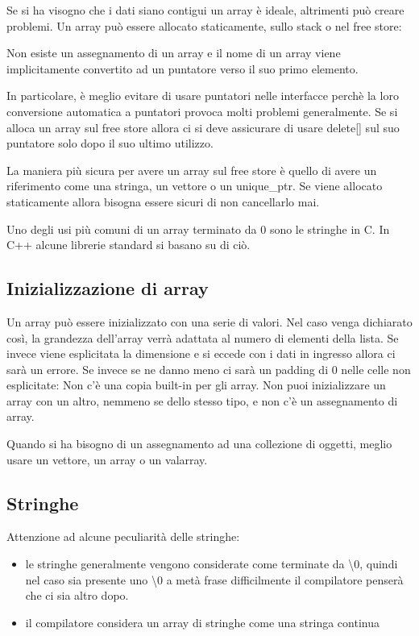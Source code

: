 \documentclass[11pt,a4paper]{book}
\begin{document}
Se si ha visogno che i dati siano contigui un array è ideale, altrimenti può creare problemi.
\label{code: 082}
Un array può essere allocato staticamente, sullo stack o nel free store:
\label{code: 083}

Non esiste un assegnamento di un array e il nome di un array viene implicitamente convertito ad un puntatore verso il suo primo elemento.

In particolare, è meglio evitare di usare puntatori nelle interfacce perchè la loro conversione automatica a puntatori provoca molti problemi generalmente. Se si alloca un array sul free store allora ci si deve assicurare di usare delete[] sul suo puntatore solo dopo il suo ultimo utilizzo.

La maniera più sicura per avere un array sul free store è quello di avere un riferimento come una stringa, un vettore o un unique\_ptr. Se viene allocato staticamente allora bisogna essere sicuri di non cancellarlo mai.

Uno degli usi più comuni di un array terminato da 0 sono le stringhe in C. In C++ alcune librerie standard si basano su di ciò.

\subsection{Inizializzazione di array}
Un array può essere inizializzato con una serie di valori. Nel caso venga dichiarato così, la grandezza dell'array verrà adattata al numero di elementi della lista. Se invece viene esplicitata la dimensione e si eccede con i dati in ingresso allora ci sarà un errore. Se invece se ne danno meno ci sarà un padding di 0 nelle celle non esplicitate:
\label{code: 084}
Non c'è una copia built-in per gli array. Non puoi inizializzare un array con un altro, nemmeno se dello stesso tipo, e non c'è un assegnamento di array.
\label{code: 085}

Quando si ha bisogno di un assegnamento ad una collezione di oggetti, meglio usare un vettore, un array o un valarray.

\subsection{Stringhe}
Attenzione ad alcune peculiarità delle stringhe:
\begin{itemize}
	\item le stringhe generalmente vengono considerate come terminate da \textbackslash0, quindi nel caso sia presente uno \textbackslash0 a metà frase difficilmente il compilatore penserà che ci sia altro dopo.
	\item il compilatore considera un array di stringhe come una stringa continua
\end{itemize}
\end{document}
